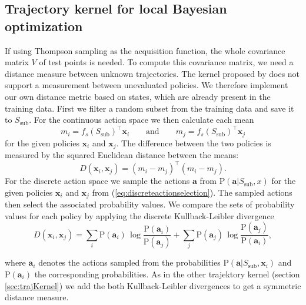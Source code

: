 \subsection{Trajectory kernel for local Bayesian optimization}
\label{sec:ownTK}
If using Thompson sampling as the acquisition function, the whole covariance matrix $V$ of test points is needed. To compute this covariance matrix, we need a distance measure between unknown trajectories. The kernel proposed by \cite{wilson2014using} does not support a measurement between unevaluated policies. We therefore implement our own distance metric based on states, which are already present in the training data. First we filter a random subset from the training data and save it to $S_{\text{sub}}$. For the continuous action space we then calculate each mean
$$m_i = f_s(S_{\text{sub}})^\top \mathbf{x}_i \qquad \text{and}\qquad m_j = f_s(S_{\text{sub}})^\top \mathbf{x}_j$$
for the given policies $\mathbf{x}_i$ and $\mathbf{x}_j$. The difference between the two policies is measured by the squared Euclidean distance between the means:
$$D(\mathbf{x}_i,\mathbf{x}_j) = (m_i - m_j)^\top (m_i - m_j).$$
For the discrete action space we sample the actions $\mathbf{a}$ from $\mathrm{P}(\mathbf{a}|S_{\text{sub}},x)$ for the given policies $\mathbf{x}_i$ and $\mathbf{x}_j$ from (\ref{eq:discreteactionselection}). The sampled actions then select the associated probability values. We compare the sets of probability values for each policy by applying the discrete Kullback-Leibler divergence
$$D(\mathbf{x}_i,\mathbf{x}_j) = \sum _{i}\mathrm{P}(\mathbf{a}_i)\,\log {\frac {\mathrm{P}(\mathbf{a}_i)}{\mathrm{P}(\mathbf{a}_j)}} + \sum _{j}\mathrm{P}(\mathbf{a}_j)\,\log {\frac {\mathrm{P}(\mathbf{a}_j)}{\mathrm{P}(\mathbf{a}_i)}},$$

where $\mathbf{a}_i$ denotes the actions sampled from the probabilities $\mathrm{P}(\mathbf{a}|S_{\text{sub}},\mathbf{x}_i)$ and $\mathrm{P}(\mathbf{a}_i)$ the corresponding probabilities. As in the other trajektory kernel (section \ref{sec:trajKernel}) we add the both Kullback-Leibler divergences to get a symmetric distance measure.

%

